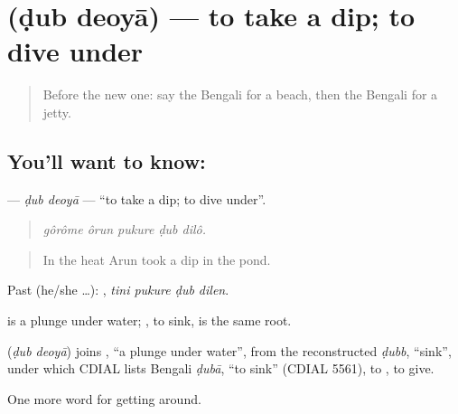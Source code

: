 \section[\texorpdfstring{\bn{ডুব} \bn{দেওয়া} (ḍub deoyā)}{ডুব দেওয়া (ḍub deoyā)}]{  (ḍub deoyā) — to take a dip; to dive under}

\label{lesson:BN-C398-dub-deoya}



\begin{quote}
Before the new one: say the Bengali for a beach, then the Bengali for a jetty.
\end{quote}

\subsection*{You'll want to know:  }
\textbf{ } — \emph{ḍub deoyā} — \textquotedblleft{}to take a dip; to dive under\textquotedblright{}.

\begin{quote}
    
\end{quote}

\begin{quote}
\emph{gôrôme ôrun pukure ḍub dilô.}
\end{quote}

\begin{quote}
In the heat Arun took a dip in the pond.
\end{quote}

Past (he/she …):    , \emph{tini pukure ḍub dilen}.

 is a plunge under water; , to sink, is the same root.

\begin{cousinweb}
\textbf{ } (\emph{ḍub deoyā}) joins , \textquotedblleft{}a plunge under water\textquotedblright{}, from the reconstructed \emph{ḍubb}, \textquotedblleft{}sink\textquotedblright{}, under which CDIAL lists Bengali \emph{ḍubā}, \textquotedblleft{}to sink\textquotedblright{} (CDIAL 5561), to , to give.
\end{cousinweb}

\begin{grammarlens}[title={What you've built}]
One more word for getting around.
\end{grammarlens}

